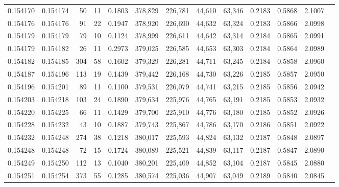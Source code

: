 \begin{tabular}{rrrrrrrrrrrrr}
0.154170 & 0.154174 &    50 &  11 &                                     0.1803 & 378,829 & 226,781 &  44,610 &  63,346 & 0.2183 & 0.5868 & 2.1007 \\
0.154176 & 0.154176 &    91 &  22 &                                     0.1947 & 378,920 & 226,690 &  44,632 &  63,324 & 0.2183 & 0.5866 & 2.0998 \\
0.154179 & 0.154179 &    79 &  10 &                                     0.1124 & 378,999 & 226,611 &  44,642 &  63,314 & 0.2184 & 0.5865 & 2.0991 \\
0.154179 & 0.154182 &    26 &  11 &                                     0.2973 & 379,025 & 226,585 &  44,653 &  63,303 & 0.2184 & 0.5864 & 2.0989 \\
0.154182 & 0.154185 &   304 &  58 &                                     0.1602 & 379,329 & 226,281 &  44,711 &  63,245 & 0.2184 & 0.5858 & 2.0960 \\
0.154187 & 0.154196 &   113 &  19 &                                     0.1439 & 379,442 & 226,168 &  44,730 &  63,226 & 0.2185 & 0.5857 & 2.0950 \\
0.154196 & 0.154201 &    89 &  11 &                                     0.1100 & 379,531 & 226,079 &  44,741 &  63,215 & 0.2185 & 0.5856 & 2.0942 \\
0.154203 & 0.154218 &   103 &  24 &                                     0.1890 & 379,634 & 225,976 &  44,765 &  63,191 & 0.2185 & 0.5853 & 2.0932 \\
0.154220 & 0.154225 &    66 &  11 &                                     0.1429 & 379,700 & 225,910 &  44,776 &  63,180 & 0.2185 & 0.5852 & 2.0926 \\
0.154228 & 0.154232 &    43 &  10 &                                     0.1887 & 379,743 & 225,867 &  44,786 &  63,170 & 0.2186 & 0.5851 & 2.0922 \\
0.154232 & 0.154248 &   274 &  38 &                                     0.1218 & 380,017 & 225,593 &  44,824 &  63,132 & 0.2187 & 0.5848 & 2.0897 \\
0.154248 & 0.154248 &    72 &  15 &                                     0.1724 & 380,089 & 225,521 &  44,839 &  63,117 & 0.2187 & 0.5847 & 2.0890 \\
0.154249 & 0.154250 &   112 &  13 &                                     0.1040 & 380,201 & 225,409 &  44,852 &  63,104 & 0.2187 & 0.5845 & 2.0880 \\
0.154251 & 0.154254 &   373 &  55 &                                     0.1285 & 380,574 & 225,036 &  44,907 &  63,049 & 0.2189 & 0.5840 & 2.0845 \\

\end{tabular}
